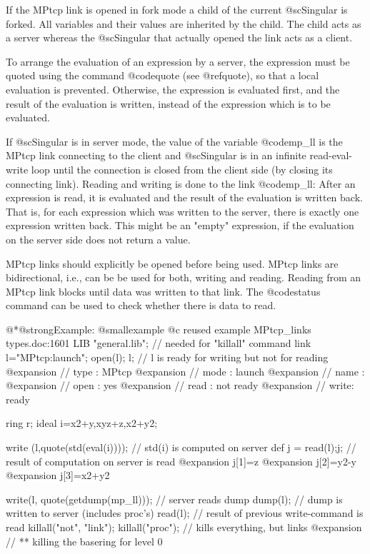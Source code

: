 {{{{{{If the MPtcp link is opened in fork mode a child of the current
@sc{Singular} is forked. All variables and their values are inherited by
the child. The child acts as a server whereas the @sc{Singular} that
actually opened the link acts as a client.

To arrange the evaluation of an expression by a server, the expression
must be quoted using the command @code{quote} (see @ref{quote}), so that
a local evaluation is prevented. Otherwise, the expression is evaluated
first, and the result of the evaluation is written, instead of the
expression which is to be evaluated.

If @sc{Singular} is in server mode, the value of the variable
@code{mp_ll} is the MPtcp link connecting to the client and
@sc{Singular} is in an infinite read-eval-write loop until the
connection is closed from the client side (by closing its connecting
link). Reading and writing is done to the link @code{mp_ll}: After an
expression is read, it is evaluated and the result of the evaluation is
written back.  That is, for each expression which was written to the
server, there is exactly one expression written back. This might be an
"empty" expression, if the evaluation on the server side does not return
a value.

MPtcp links should explicitly be opened before being used. MPtcp links
are bidirectional, i.e., can be be used for both, writing and
reading. Reading from an MPtcp link blocks until data was written to
that link. The @code{status} command can be used to check whether there
is data to read.

@*@strong{Example:}
@smallexample
@c reused example MPtcp_links types.doc:1601 
  LIB "general.lib"; // needed for "killall" command
  link l="MPtcp:launch";
  open(l); l;        // l is ready for writing but not for reading
@expansion{} // type : MPtcp
@expansion{} // mode : launch
@expansion{} // name : 
@expansion{} // open : yes
@expansion{} // read : not ready
@expansion{} // write: ready

  ring r; ideal i=x2+y,xyz+z,x2+y2;

  write (l,quote(std(eval(i))));   // std(i) is computed on server
  def j = read(l);j; // result of computation on server is read
@expansion{} j[1]=z
@expansion{} j[2]=y2-y
@expansion{} j[3]=x2+y2

  write(l, quote(getdump(mp_ll))); // server reads dump
  dump(l);           //  dump is written to server (includes proc's)
  read(l);           // result of previous write-command is read
  killall("not", "link"); killall("proc"); // kills everything, but links
@expansion{} // ** killing the basering for level 0

}}}}}}
